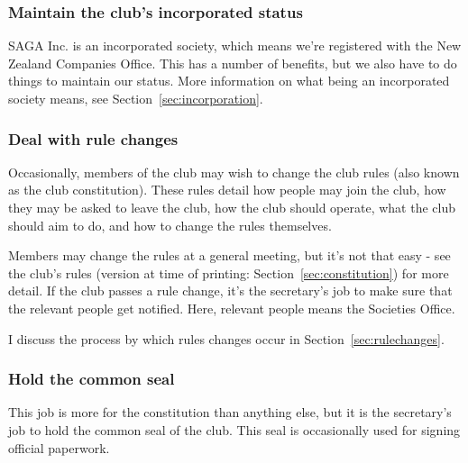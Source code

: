\subsubsection{Maintain the club's incorporated status}

SAGA Inc. is an incorporated society, which means we're registered with the New Zealand Companies Office. This has a number of benefits, but we also have to do things to maintain our status. More information on what being an incorporated society means, see Section~\ref{sec:incorporation}.

\subsubsection{Deal with rule changes}

Occasionally, members of the club may wish to change the club rules (also known as the club constitution). These rules detail how people may join the club, how they may be asked to leave the club, how the club should operate, what the club should aim to do, and how to change the rules themselves.

Members may change the rules at a general meeting, but it's not that easy - see the club's rules (version at time of printing: Section~\ref{sec:constitution}) for more detail. If the club passes a rule change, it's the secretary's job to make sure that the relevant people get notified. Here, relevant people means the Societies Office.

I discuss the process by which rules changes occur in Section~\ref{sec:rulechanges}.

\subsubsection{Hold the common seal}

This job is more for the constitution than anything else, but it is the secretary's job to hold the common seal of the club. This seal is occasionally used for signing official paperwork.